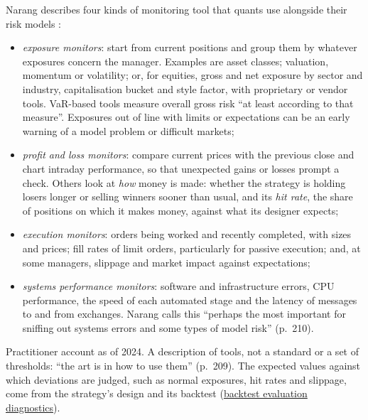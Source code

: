 \begin{qfmethod}\label{meth:quant-strategy-monitoring}
 Narang describes four kinds of monitoring tool that quants use alongside their risk models \citep[chap.~``Risks Inherent to Quant Strategies'', sec.~10.5, pp.~209--210]{s7-narang}:
\begin{itemize}
\item \emph{exposure monitors}: start from current positions and group them by whatever exposures concern the manager. Examples are asset classes; valuation, momentum or volatility; or, for equities, gross and net exposure by sector and industry, capitalisation bucket and style factor, with proprietary or vendor tools. VaR-based tools measure overall gross risk ``at least according to that measure''. Exposures out of line with limits or expectations can be an early warning of a model problem or difficult markets;
\item \emph{profit and loss monitors}: compare current prices with the previous close and chart intraday performance, so that unexpected gains or losses prompt a check. Others look at \emph{how} money is made: whether the strategy is holding losers longer or selling winners sooner than usual, and its \emph{hit rate}, the share of positions on which it makes money, against what its designer expects;
\item \emph{execution monitors}: orders being worked and recently completed, with sizes and prices; fill rates of limit orders, particularly for passive execution; and, at some managers, slippage and market impact against expectations;
\item \emph{systems performance monitors}: software and infrastructure errors, CPU performance, the speed of each automated stage and the latency of messages to and from exchanges. Narang calls this ``perhaps the most important for sniffing out systems errors and some types of model risk'' (p.~210).
\end{itemize}

 Practitioner account as of 2024. A description of tools, not a standard or a set of thresholds: ``the art is in how to use them'' (p.~209). The expected values against which deviations are judged, such as normal exposures, hit rates and slippage, come from the strategy's design and its backtest (\hyperref[meth:backtest-evaluation-diagnostics]{backtest evaluation diagnostics}).


\end{qfmethod}
